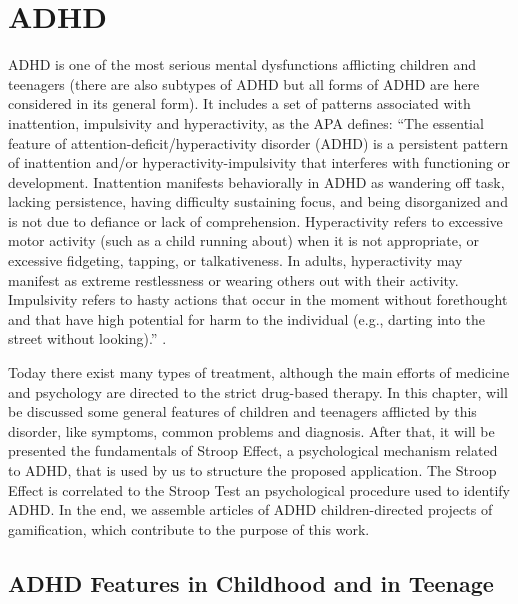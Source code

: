 \chapter{ADHD}

\label{ch:ADHD}





ADHD is one of the most serious mental dysfunctions afflicting children and teenagers (there are also subtypes of ADHD but all forms of ADHD are here considered in its general form). It includes a set of patterns associated with inattention, impulsivity and hyperactivity, as the APA defines: ``The essential feature of attention-deficit/hyperactivity disorder (ADHD) is a persistent pattern of inattention and/or hyperactivity-impulsivity that interferes with functioning or development. Inattention manifests behaviorally in ADHD as wandering off task, lacking persistence, having difficulty sustaining focus, and being disorganized and is not due to defiance or lack of comprehension. Hyperactivity refers to excessive motor activity (such as a child running about) when it is not appropriate, or excessive fidgeting, tapping, or talkativeness. In adults, hyperactivity may manifest as extreme restlessness or wearing others out with their activity. Impulsivity refers to hasty actions that occur in the moment without forethought and that have high potential for harm to the individual (e.g., darting into the street without looking).'' \citep{dsm-american}. 



Today there exist many types of treatment, although the main efforts of medicine and psychology are directed to the strict drug-based therapy. In this chapter, will be discussed some general features of children and teenagers afflicted by this disorder, like symptoms, common problems and diagnosis. After that, it will be presented the fundamentals of Stroop Effect, a psychological mechanism related to ADHD, that is used by us to structure the proposed application. The Stroop Effect is correlated to the Stroop Test an psychological procedure used to identify ADHD. In the end, we assemble articles of ADHD children-directed projects of gamification, which contribute to the purpose of this work. 





\section{ADHD Features in Childhood and in Teenage}



